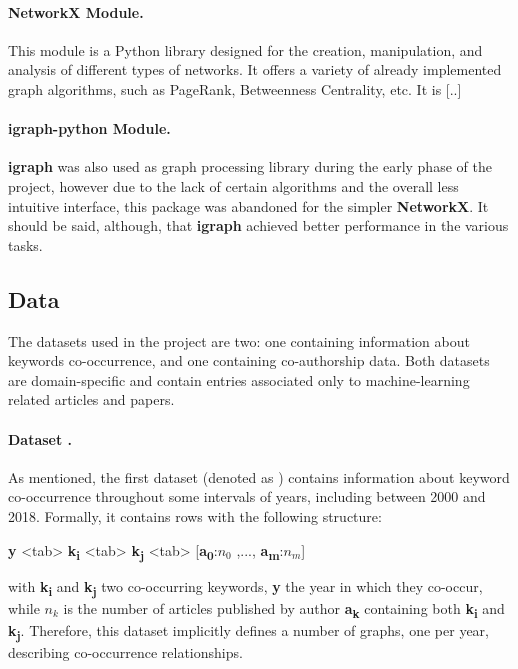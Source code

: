 \paragraph{\textbf{NetworkX Module.}} This module is a Python library designed for the creation, manipulation, and analysis of different types of networks. It offers a variety of already implemented graph algorithms, such as PageRank, Betweenness Centrality, etc.
It is [..]

\paragraph{\textbf{igraph-python Module.}}
\textbf{igraph} was also used as graph processing library during the early phase of the project, however due to the lack of certain algorithms and the overall less intuitive interface, this package was abandoned for the simpler \textbf{NetworkX}. It should be said, although, that \textbf{igraph} achieved better performance in the various tasks.


\subsection{Data}
The datasets used in the project are two: one containing information about keywords co-occurrence, and one containing co-authorship data. Both datasets are domain-specific and contain entries associated only to machine-learning related articles and papers. 

\paragraph{\textbf{Dataset \DSone}.}
As mentioned, the first dataset (denoted  as \DSone{}) contains information about keyword co-occurrence throughout some intervals of years, including between 2000 and 2018. Formally, it contains rows with the following structure:
\begin{center}
\newcommand{\TAB}{\textless tab\textgreater}
\textbf{y} \TAB{} \textbf{k\textsubscript{i}} \TAB{} \textbf{k\textsubscript{j}} \TAB{} [\textbf{a\textsubscript{0}}:$n_0$ ,..., \textbf{a\textsubscript{m}}:$n_m$]
\end{center}
with \textbf{k\textsubscript{i}} and \textbf{k\textsubscript{j}} two co-occurring keywords, \textbf{y} the year in which they co-occur, while $n_k$ is the number of articles published by author \textbf{a\textsubscript{k}} containing both \textbf{k\textsubscript{i}} and \textbf{k\textsubscript{j}}.
Therefore, this dataset implicitly defines a number of graphs, one per year, describing co-occurrence relationships. %



